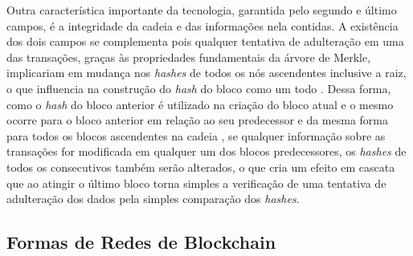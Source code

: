 %
Outra característica importante da tecnologia, garantida pelo segundo e último campos, é a integridade da cadeia e das informações nela contidas. A existência dos dois campos se complementa pois qualquer tentativa de adulteração em uma das transações, graças às propriedades fundamentais da árvore de Merkle, implicariam em mudança nos \textit{hashes} de todos os nós ascendentes inclusive a raiz, o que influencia na construção do \textit{hash} do bloco como um todo \cite{blockchain:arvore_merkle}.
%
Dessa forma, como o \textit{hash} do bloco anterior é utilizado na criação do bloco atual e o mesmo ocorre para o bloco anterior em relação ao seu predecessor e da mesma forma para todos os blocos ascendentes na cadeia \cite{blockchain:bitcoin_whitepaper}, se qualquer informação sobre as transações for modificada em qualquer um dos blocos predecessores, os \textit{hashes} de todos os consecutivos também serão alterados, o que cria um efeito em cascata que ao atingir o último bloco torna simples a verificação de uma tentativa de adulteração dos dados pela simples comparação dos \textit{hashes}.

\subsection{Formas de Redes de Blockchain}
\label{subsec:blockchain:pub_priv}

